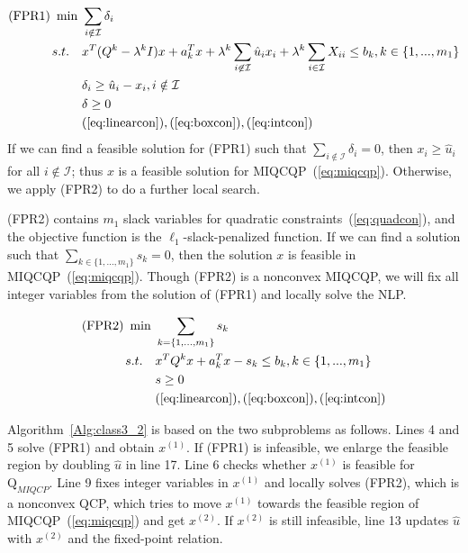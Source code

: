 \documentclass[]{article}
\begin{document}
\begin{equation*}%
    \begin{aligned}
        (\mbox{FPR1})\ \min\ &\sum_{i\notin\mathcal{I}} \delta_i\\
        s.t.\quad &x^T(Q^k-\lambda^k I)x + a_k^Tx + \lambda^k\sum_{i\not\in \mathcal{I}}\hat{u}_ix_i + \lambda^k\sum_{i\in \mathcal{I}}X_{ii} \leq b_k, k\in \{1,...,m_1\}\\
        &\delta_i \geq \hat{u}_i -x_i, i\notin \mathcal{I}\\
        &\delta \geq 0\\
        &(\ref{eq:linearcon}),(\ref{eq:boxcon}),(\ref{eq:intcon})
    \end{aligned}
\end{equation*}
If we can find a feasible solution for (FPR1) such that $\sum_{i\notin\mathcal{I}}\delta_i = 0$, then $x_i\geq \hat{u}_i$ for all $i\notin \mathcal{I}$; thus $x$ is a feasible solution for MIQCQP~(\ref{eq:miqcqp}).  Otherwise, we apply (FPR2) to do a further local search. 

(FPR2) contains $m_1$ slack variables for quadratic constraints~(\ref{eq:quadcon}), and the objective function is the $\ell_1$-slack-penalized function. If we can find a solution such that  $\sum_{k\in\{1,...,m_1\}} s_k = 0$, then the solution $x$ is feasible in MIQCQP~(\ref{eq:miqcqp}). Though (FPR2) is a nonconvex MIQCQP, we will fix all integer variables from the solution of (FPR1) and locally solve the NLP.

\begin{equation*}%
    \begin{aligned}
        (\mbox{FPR2})\ \min\ &\sum_{k=\{1,...,m_1\}} s_k\\
        s.t.\quad &x^TQ^kx + a_k^Tx  - s_k \leq b_k, k\in \{1,...,m_1\}\\
        &s \geq 0\\
        &(\ref{eq:linearcon}),(\ref{eq:boxcon}),(\ref{eq:intcon})
    \end{aligned}
\end{equation*}


Algorithm~\ref{Alg:class3_2} is based on the two subproblems as follows. Lines 4 and 5 solve (FPR1) and obtain $x^{(1)}$. If (FPR1) is infeasible, we enlarge the feasible region by doubling $\hat{u}$ in line 17. Line 6 checks whether $x^{(1)}$ is feasible for $\mathrm{Q}_{MIQCP}$. Line 9 fixes integer variables in $x^{(1)}$ and locally solves (FPR2), which is a nonconvex QCP, which tries to move $x^{(1)}$ towards the feasible region of MIQCQP~(\ref{eq:miqcqp}) and get $x^{(2)}$. If $x^{(2)}$ is still infeasible, line 13 updates $\hat{u}$ with $x^{(2)}$ and the fixed-point relation.
\end{document}
